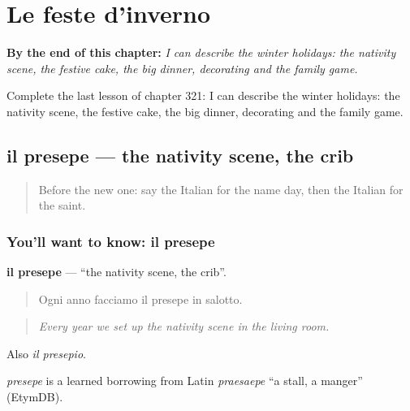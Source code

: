 
\chapter{Le feste d'inverno}
\label{ch:it-le-feste-d-inverno}

\begin{chapteropening}
\textbf{By the end of this chapter:} \emph{I can describe the winter holidays: the nativity scene, the festive cake, the big dinner, decorating and the family game.}

Complete the last lesson of chapter 321: I can describe the winter holidays: the nativity scene, the festive cake, the big dinner, decorating and the family game.
\end{chapteropening}

\section[il presepe]{il presepe — the nativity scene, the crib}

\label{lesson:IT-C321-presepe}



\begin{quote}
Before the new one: say the Italian for the name day, then the Italian for the saint.
\end{quote}

\subsection*{You'll want to know: il presepe}
\textbf{il presepe} — \textquotedblleft{}the nativity scene, the crib\textquotedblright{}.

\begin{quote}
Ogni anno facciamo il presepe in salotto.
\end{quote}

\begin{quote}
\emph{Every year we set up the nativity scene in the living room.}
\end{quote}

Also \emph{il presepio}.

\begin{cousinweb}
\emph{presepe} is a learned borrowing from Latin \emph{praesaepe} \textquotedblleft{}a stall, a manger\textquotedblright{} (EtymDB).
\end{cousinweb}

